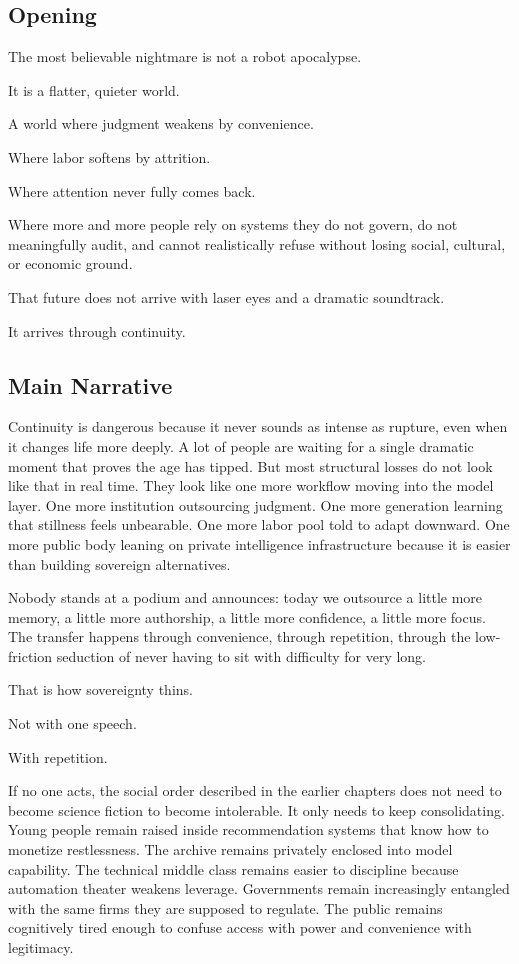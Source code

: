 \documentclass[
  american,
  12pt,
  letterpaper,
]{article}
\begin{document}
\subsection{Opening}\label{opening-9}

The most believable nightmare is not a robot apocalypse.

It is a flatter, quieter world.

A world where judgment weakens by convenience.

Where labor softens by attrition.

Where attention never fully comes back.

Where more and more people rely on systems they do not govern, do not
meaningfully audit, and cannot realistically refuse without losing
social, cultural, or economic ground.

That future does not arrive with laser eyes and a dramatic soundtrack.

It arrives through continuity.

\subsection{Main Narrative}\label{main-narrative-9}

Continuity is dangerous because it never sounds as intense as rupture,
even when it changes life more deeply. A lot of people are waiting for a
single dramatic moment that proves the age has tipped. But most
structural losses do not look like that in real time. They look like one
more workflow moving into the model layer. One more institution
outsourcing judgment. One more generation learning that stillness feels
unbearable. One more labor pool told to adapt downward. One more public
body leaning on private intelligence infrastructure because it is easier
than building sovereign alternatives.

Nobody stands at a podium and announces: today we outsource a little
more memory, a little more authorship, a little more confidence, a
little more focus. The transfer happens through convenience, through
repetition, through the low-friction seduction of never having to sit
with difficulty for very long.

That is how sovereignty thins.

Not with one speech.

With repetition.

If no one acts, the social order described in the earlier chapters does
not need to become science fiction to become intolerable. It only needs
to keep consolidating. Young people remain raised inside recommendation
systems that know how to monetize restlessness. The archive remains
privately enclosed into model capability. The technical middle class
remains easier to discipline because automation theater weakens
leverage. Governments remain increasingly entangled with the same firms
they are supposed to regulate. The public remains cognitively tired
enough to confuse access with power and convenience with legitimacy.
\end{document}
